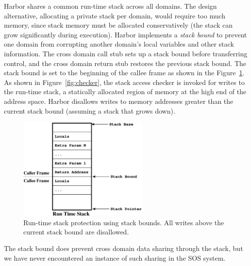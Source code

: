 Harbor shares a common run-time stack across all domains.
%
The design alternative, allocating a private stack per domain,
%
would require too much memory, since stack memory must be allocated
conservatively (the stack can grow significantly during execution).
%
%
%
Harbor implements a \emph{stack bound} to prevent one domain from
corrupting another domain's local variables and other stack
information.
%
The cross domain call stub sets up a stack bound before transferring
control, and the cross domain return stub restores the previous stack
bound.
%
The stack bound is set to the beginning of the callee frame as shown
in the Figure~\ref{fig:stackbound}.
%
As shown in Figure~\ref{fig:checker}, the stack access checker is invoked
for writes to the run-time stack, a statically allocated region of memory
at the high end of the address space.
%
Harbor disallows writes to memory addresses greater than the current stack
bound (assuming a stack that grows down).
%
%
%
\begin{figure}[htbp]
   \centering
   \includegraphics[height=2.0in, keepaspectratio=true]{figures/stack_bounds.eps} 
   \caption[Run-time stack protection using stack bounds]{Run-time stack protection using stack bounds. All writes
     above the current stack bound are disallowed.}
   \label{fig:stackbound}
\end{figure}


The stack bound does prevent cross domain data sharing through the stack,
but we have never encountered an instance of such sharing
in the SOS system.
%


